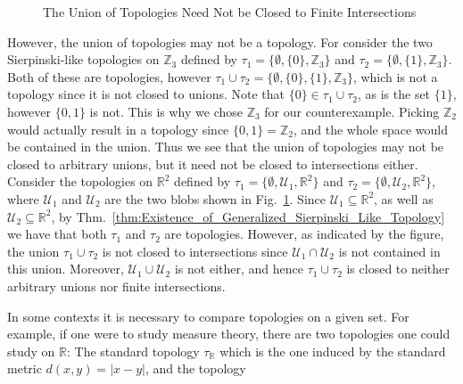     \begin{figure}[H]
        \centering
        \captionsetup{type=figure}
        
        \caption{The Union of Topologies Need Not be Closed
                 to Finite Intersections}
        \label{fig:Union_of_Topologies_Not_Closed_to_Intersections}
    \end{figure}
    However, the union of topologies may not be a topology. For consider the two
    Sierpinski-like topologies on $\mathbb{Z}_{3}$ defined by
    $\tau_{1}=\{\emptyset,\{0\},\mathbb{Z}_{3}\}$ and
    $\tau_{2}=\{\emptyset,\{1\},\mathbb{Z}_{3}\}$. Both of these are topologies,
    however $\tau_{1}\cup\tau_{2}=\{\emptyset,\{0\},\{1\},\mathbb{Z}_{3}\}$,
    which is not a topology since it is not closed to unions. Note that
    $\{0\}\in\tau_{1}\cup\tau_{2}$, as is the set $\{1\}$, however $\{0,1\}$ is
    not. This is why we chose $\mathbb{Z}_{3}$ for our counterexample. Picking
    $\mathbb{Z}_{2}$ would actually result in a topology since
    $\{0,1\}=\mathbb{Z}_{2}$, and the whole space would be contained in the
    union. Thus we see that the union of topologies may not be closed to
    arbitrary unions, but it need not be closed to intersections either.
    Consider the topologies on $\mathbb{R}^{2}$ defined by
    $\tau_{1}=\{\emptyset,\mathcal{U}_{1},\mathbb{R}^{2}\}$ and
    $\tau_{2}=\{\emptyset,\mathcal{U}_{2},\mathbb{R}^{2}\}$, where
    $\mathcal{U}_{1}$ and $\mathcal{U}_{2}$ are the two blobs shown in
    Fig.~\ref{fig:Union_of_Topologies_Not_Closed_to_Intersections}. Since
    $\mathcal{U}_{1}\subseteq\mathbb{R}^{2}$, as well as
    $\mathcal{U}_{2}\subseteq\mathbb{R}^{2}$, by
    Thm.~\ref{thm:Existence_of_Generalized_Sierpinski_Like_Topology} we have
    that both $\tau_{1}$ and $\tau_{2}$ are topologies. However, as indicated
    by the figure, the union $\tau_{1}\cup\tau_{2}$ is not closed to
    intersections since $\mathcal{U}_{1}\cap\mathcal{U}_{2}$ is not contained in
    this union. Moreover, $\mathcal{U}_{1}\cup\mathcal{U}_{2}$ is not either,
    and hence $\tau_{1}\cup\tau_{2}$ is closed to neither arbitrary unions nor
    finite intersections.
    \par\hfill\par
    In some contexts it is necessary to compare topologies on a given set. For
    example, if one were to study measure theory, there are two topologies one
    could study on $\mathbb{R}$: The standard topology $\tau_{\mathbb{R}}$ which
    is the one induced by the standard metric $d(x,y)=|x-y|$, and the topology
